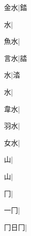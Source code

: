 \begin{multicols}{2}
{{\cjk{}{\cnsym{}　}金水}\mktsJzrVerticalBar{}{\cjk{}{\cnsym{}　}{\cnsym{}　}{\cnsym{}　}}|{\cjk{}錔}\par
{水}\mktsJzrVerticalBar{}{\cjk{}{\cnsym{}　}{\cnsym{}　}{\cnsym{}　}}|{}\par
{\cjk{}{\cnsym{}　}魚水}\mktsJzrVerticalBar{}{\cjk{}{\cnsym{}　}{\cnsym{}　}{\cnsym{}　}}|{}\par
{\cjk{}{\cnsym{}　}言水}\mktsJzrVerticalBar{}{\cjk{}{\cnsym{}　}{\cnsym{}　}{\cnsym{}　}}|{\cjk{}誻}\par
{水}\mktsJzrVerticalBar{}{\cjk{}{\cnsym{}　}{\cnsym{}　}{\cnsym{}　}}|{\cjk{}涾}\par
{水}\mktsJzrVerticalBar{}{\cjk{}{\cnsym{}　}{\cnsym{}　}{\cnsym{}　}}|{}\par
{\cjk{}{\cnsym{}　}韋水}\mktsJzrVerticalBar{}{\cjk{}{\cnsym{}　}{\cnsym{}　}{\cnsym{}　}}|{}\par
{\cjk{}{\cnsym{}　}羽水}\mktsJzrVerticalBar{}{\cjk{}{\cnsym{}　}{\cnsym{}　}{\cnsym{}　}}|{}\par
{\cjk{}{\cnsym{}　}女水}\mktsJzrVerticalBar{}{\cjk{}{\cnsym{}　}{\cnsym{}　}{\cnsym{}　}}|{}\par
{\cjk{}{\cnsym{}　}{\cnsym{}　}山}\mktsJzrVerticalBar{}{\cjk{}{\cnsym{}　}{\cnsym{}　}{\cnsym{}　}}|{}\par
{山}\mktsJzrVerticalBar{}{\cjk{}{\cnsym{}　}{\cnsym{}　}{\cnsym{}　}}|{}\par
{\cjk{}{\cnsym{}　}{\cnsym{}　}冂}\mktsJzrVerticalBar{}{\cjk{}{\cnsym{}　}{\cnsym{}　}{\cnsym{}　}}|{}\par
{一冂}\mktsJzrVerticalBar{}{\cjk{}{\cnsym{}　}{\cnsym{}　}{\cnsym{}　}}|{}\par
{\cjk{}冂日冂}\mktsJzrVerticalBar{}{\cjk{}{\cnsym{}　}{\cnsym{}　}{\cnsym{}　}}|{}\par
}
\end{multicols}
